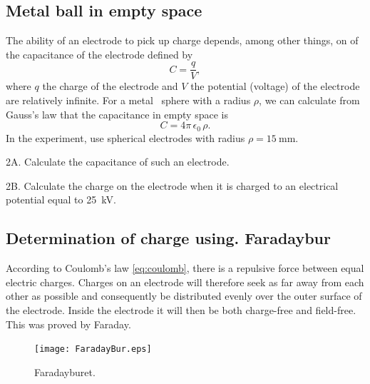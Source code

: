 \documentclass[../Elmag-labhefte-2022.tex]{subfiles}
\begin{document}
\subsection{Metal ball in empty space}

The ability of an electrode to pick up charge depends, among other things, on of the capacitance of the electrode defined by
\begin{equation}
    C = \frac{q}{V},
    \label{eq:coulomb.3.1}
\end{equation}
where $q$ the charge of the electrode and $V$ the potential (voltage) of the electrode are relatively infinite. For a metal \ sphere with a radius $\rho$, we can calculate from Gauss's law that the capacitance in empty space is
\begin{equation}
    C = 4\pi\, \epsilon_0 \, \rho .
    \label{eq:coulomb.3.2}
\end{equation}
%
In the experiment, use spherical electrodes with radius $\rho = \SI{15}{\milli\m}$.

{\itsf 2A. Calculate the capacitance of such an electrode.}

{\itsf 2B. Calculate the charge on the electrode when it is charged to an electrical potential equal to \SI{25}{\kilo\volt}. }

\subsection{Determination of charge using. Faradaybur \label{ch.Faradaybur}}

According to Coulomb's law \eqref{eq:coulomb}, there is a repulsive force between equal electric charges. Charges on an electrode will therefore seek as far away from each other as possible and consequently be distributed evenly over the outer surface of the electrode. Inside the electrode it will then be both charge-free and field-free. This was proved by Faraday.
\begin{figure}[!ht]
    \centering
    \texttt{[image: FaradayBur.eps]}
    \vspace{-5mm}
    \caption{%
        Faradayburet.
    }
    \label{fig:FaradayBur}
    \vspace{-5mm}
\end{figure}
 
\end{document}
